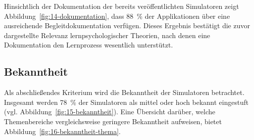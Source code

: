 Hinsichtlich der Dokumentation der bereits veröffentlichten Simulatoren zeigt Abbildung~\ref{fig:14-dokumentation}, dass 88~\% der Applikationen über eine ausreichende Begleitdokumentation verfügen. Dieses Ergebnis bestätigt die zuvor dargestellte Relevanz lernpsychologischer Theorien, nach denen eine Dokumentation den Lernprozess wesentlich unterstützt.

\subsection{Bekanntheit}

Als abschließendes Kriterium wird die Bekanntheit der Simulatoren betrachtet. Insgesamt werden 78~\% der Simulatoren als mittel oder hoch bekannt eingestuft (vgl. Abbildung~\ref{fig:15-bekanntheit}). Eine Übersicht darüber, welche Themenbereiche vergleichsweise geringere Bekanntheit aufweisen, bietet Abbildung~\ref{fig:16-bekanntheit-thema}.

